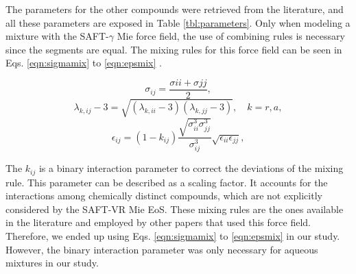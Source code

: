 \documentclass[final,12p,times,twocolumn]{elsarticle}
\begin{document}
	The parameters for the other compounds were retrieved from the literature, and all these parameters are exposed in Table \ref{tbl:parameters}. Only when modeling a mixture with the SAFT-$\gamma$ Mie force field, the use of combining rules is necessary since the segments are equal. The mixing rules for this force field can be seen in Eqs. \ref{eqn:sigmamix} to \ref{eqn:epsmix} \cite{lafitte2013}.
	
	\begin{equation}
	\sigma_{ij} =\frac{\sigma{ii}+\sigma{jj}}{2},
	\label{eqn:sigmamix}
	\end{equation}
	\begin{equation}
	\lambda_{k,ij} -3 =\sqrt{(\lambda_{k,ii}-3)(\lambda_{k,jj}-3)}, \quad k=r,a,
	\label{eqn:lambdamix}
	\end{equation}
	\begin{equation}
	\label{eqn:epsmix}
	\epsilon_{ij} =(1-k_{ij})\frac{\sqrt{\sigma_{ii}^{3}\sigma_{jj}^{3}}}{\sigma_{ij}^{3}}\sqrt{\epsilon_{ii}\epsilon_{jj}},
	\end{equation}
	
	The $k_{ij}$ is a binary interaction parameter to correct the deviations of the mixing rule. This parameter can be described as a scaling factor. It accounts for the interactions among chemically distinct compounds, which are not explicitly considered by the SAFT-VR Mie EoS. These mixing rules are the ones available in the literature and employed by other papers that used this force field. Therefore, we ended up using Eqs. \ref{eqn:sigmamix} to \ref{eqn:epsmix} in our study. However, the binary interaction parameter was only necessary for aqueous mixtures in our study.   
	
\end{document}
